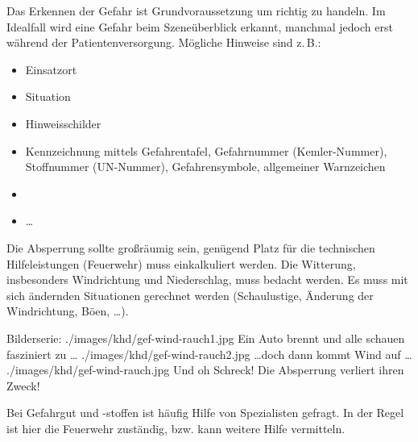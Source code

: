 {Das Erkennen der Gefahr ist Grundvoraussetzung um richtig
zu handeln. Im Idealfall wird eine Gefahr beim
Szeneüberblick erkannt, manchmal jedoch erst während der
Patientenversorgung.
Mögliche Hinweise sind z.\,B.:
\begin{itemize}
  \item Einsatzort 
  \item Situation
  \item Hinweisschilder
  \item Kennzeichnung mittels Gefahrentafel, Gefahrnummer
  (Kemler-Nummer), Stoffnummer (UN-Nummer), Gefahrensymbole,
  allgemeiner Warnzeichen
  \item {}
  \item \ldots
\end{itemize}

}{}
{}
{}
{}


{\label{topic:absperrmassnahmen}
Die Absperrung sollte großräumig  sein, genügend Platz für
die technischen Hilfeleistungen (Feuerwehr) muss
einkalkuliert werden. Die Witterung, insbesonders
Windrichtung und Niederschlag, muss bedacht werden. Es muss
mit sich ändernden Situationen gerechnet werden
(Schaulustige, Änderung der Windrichtung, Böen, \ldots).

}
{}
{}
{}
{}

\begin{PictureSeriesWide}{}
{Bilderserie:
 }
{./images/khd/gef-wind-rauch1.jpg}
{Ein Auto brennt und alle schauen
fasziniert zu \ldots }
{./images/khd/gef-wind-rauch2.jpg}
{\ldots doch dann kommt Wind auf \ldots  }
{./images/khd/gef-wind-rauch.jpg}
{Und oh Schreck! Die Absperrung
verliert ihren Zweck! }
{}
{}
\end{PictureSeriesWide}

\begin{Synopsis}
\end{Synopsis}



{Bei Gefahrgut und -stoffen ist häufig Hilfe von
Spezialisten gefragt. In der Regel ist hier die Feuerwehr
zuständig, bzw. kann weitere Hilfe vermitteln.
}
{}
{}
{}
{}




\nocite{Cicero911CommissionReport}



\ChapterEnd
